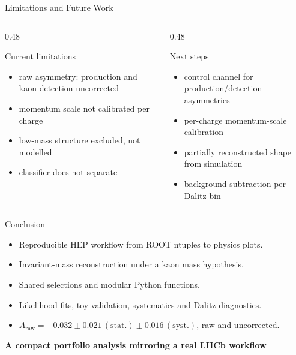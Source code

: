 \documentclass[aspectratio=169,10pt]{beamer}
\begin{document}
\begin{frame}{Limitations and Future Work}
  \begin{columns}[T,onlytextwidth]
    \begin{column}{0.48\textwidth}
      \begin{block}{Current limitations}
        \begin{itemize}
          \item raw asymmetry: production and kaon detection uncorrected
          \item momentum scale not calibrated per charge
          \item low-mass structure excluded, not modelled
          \item classifier does not separate
        \end{itemize}
      \end{block}
    \end{column}
    \begin{column}{0.48\textwidth}
      \begin{block}{Next steps}
        \begin{itemize}
          \item control channel for production/detection asymmetries
          \item per-charge momentum-scale calibration
          \item partially reconstructed shape from simulation
          \item background subtraction per Dalitz bin
        \end{itemize}
      \end{block}
    \end{column}
  \end{columns}
\end{frame}

\begin{frame}{Conclusion}
  \begin{itemize}
    \item Reproducible HEP workflow from ROOT ntuples to physics plots.
    \item Invariant-mass reconstruction under a kaon mass hypothesis.
    \item Shared selections and modular Python functions.
    \item Likelihood fits, toy validation, systematics and Dalitz diagnostics.
    \item $A_{\mathrm{raw}} = -0.032 \pm 0.021\,\mathrm{(stat.)} \pm 0.016\,\mathrm{(syst.)}$, raw and uncorrected.
  \end{itemize}

  \vspace{0.5cm}
  \begin{center}
    \Large \textbf{A compact portfolio analysis mirroring a real LHCb workflow}
  \end{center}
\end{frame}
\end{document}

